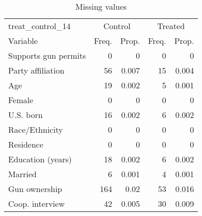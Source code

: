 \begin{table}[!htbp] \centering 
 \renewcommand*{\arraystretch}{1.1} 

\caption{Missing values}

\label{missing_tab}

\begin{tabular}{lrrrr}
\hline
\hline
treat\_control\_14 & \multicolumn{2}{c}{Control} & \multicolumn{2}{c}{Treated}  \\ 
 Variable & \multicolumn{1}{c}{Freq.} & \multicolumn{1}{c}{Prop.} & \multicolumn{1}{c}{Freq.} & \multicolumn{1}{c}{Prop.} \\ 
\hline
Supports gun permits & 0 & 0 & 0 & 0 \\ 
Party affiliation & 56 & 0.007 & 15 & 0.004 \\ 
Age & 19 & 0.002 & 5 & 0.001 \\ 
Female & 0 & 0 & 0 & 0 \\ 
U.S. born & 16 & 0.002 & 6 & 0.002 \\ 
Race/Ethnicity & 0 & 0 & 0 & 0 \\ 
Residence & 0 & 0 & 0 & 0 \\ 
Education (years) & 18 & 0.002 & 6 & 0.002 \\ 
Married & 6 & 0.001 & 4 & 0.001 \\ 
Gun ownership & 164 & 0.02 & 53 & 0.016 \\ 
Coop. interview & 42 & 0.005 & 30 & 0.009\\ 
\hline
\hline
\end{tabular}
\end{table}

